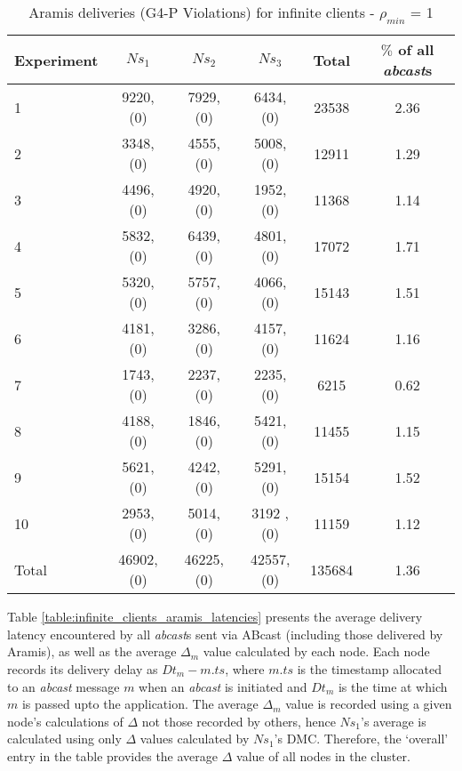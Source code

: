 \begin{table}[p]
  \begin{center}
  \renewcommand{\arraystretch}{1.3}
   \begin{tabular}{|l|c|c|c|c|c|}
    \hline
    Experiment & $Ns_1$ & $Ns_2$       & $Ns_3$      & Total    & $\%$ of all \emph{abcast}s \\ \hline \hline
    1          & 9220, (0)  & 7929, (0)  & 6434, (0)  & 23538 & 2.36 \\ \hline
    2          & 3348, (0)  & 4555, (0)  & 5008, (0)  & 12911 & 1.29 \\ \hline
    3          & 4496, (0)  & 4920, (0)  & 1952, (0)  & 11368 & 1.14 \\ \hline
    4          & 5832, (0)  & 6439, (0)  & 4801, (0)  & 17072 & 1.71 \\ \hline
    5          & 5320, (0)  & 5757, (0)  & 4066, (0)  & 15143 & 1.51 \\ \hline
    6          & 4181, (0)  & 3286, (0)  & 4157, (0)  & 11624 & 1.16 \\ \hline
    7          & 1743, (0)  & 2237, (0)  & 2235, (0)  & 6215   & 0.62 \\ \hline
    8          & 4188, (0)  & 1846, (0)  & 5421, (0)  & 11455 & 1.15 \\ \hline
    9          & 5621, (0)  & 4242, (0)  & 5291, (0)  & 15154 & 1.52 \\ \hline
    10        & 2953, (0)  & 5014, (0)  & 3192 , (0) & 11159 & 1.12 \\ \hline \hline
    Total    &46902, (0) &46225, (0) &42557, (0) &135684 & 1.36\\ \hline
    \end{tabular}
    \caption{Aramis deliveries (G4-P Violations) for infinite clients - $\rho_{min}$ = 1}
    \label{table:infinite_clients_rejections}
  \end{center}
\end{table}
    
    Table \ref{table:infinite_clients_aramis_latencies} presents the average delivery latency encountered by all \emph{abcast}s sent via \textsf{ABcast} (including those delivered by \textsf{Aramis}), as well as the average $\Delta_m$ value calculated by each node.  Each node records its delivery delay as $Dt_m - m.ts$, where $m.ts$ is the timestamp allocated to an \emph{abcast} message $m$ when an \emph{abcast} is initiated and $Dt_m$ is the time at which $m$ is passed upto the application.  The average $\Delta_m$ value is recorded using a given node's calculations of $\Delta$ not those recorded by others, hence $Ns_1$'s average is calculated using only $\Delta$ values calculated by $Ns_1$'s DMC.  Therefore, the \textquoteleft{}overall' entry in the table provides the average $\Delta$ value of all nodes in the cluster.  
    
